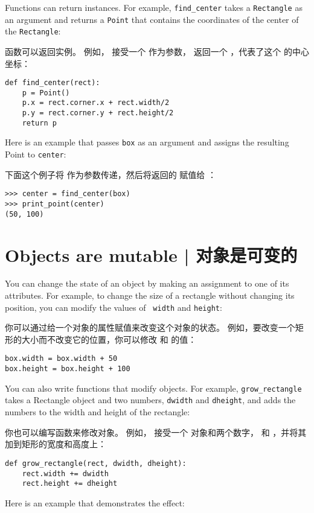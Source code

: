 Functions can return instances.  For example, \verb"find_center"
takes a {\tt Rectangle} as an argument and returns a {\tt Point}
that contains the coordinates of the center of the {\tt Rectangle}:

函数可以返回实例。 例如，  接受一个  作为参数，
返回一个  ，代表了这个  的中心坐标：

\begin{lstlisting}
def find_center(rect):
    p = Point()
    p.x = rect.corner.x + rect.width/2
    p.y = rect.corner.y + rect.height/2
    return p
\end{lstlisting}

%
Here is an example that passes {\tt box} as an argument and assigns
the resulting Point to {\tt center}:

下面这个例子将  作为参数传递，然后将返回的  赋值给 ：

\begin{lstlisting}
>>> center = find_center(box)
>>> print_point(center)
(50, 100)
\end{lstlisting}
%

\section{Objects are mutable  |  对象是可变的}
  

You can change the state of an object by making an assignment to one of
its attributes.  For example, to change the size of a rectangle
without changing its position, you can modify the values of {\tt
width} and {\tt height}:


你可以通过给一个对象的属性赋值来改变这个对象的状态。
例如，要改变一个矩形的大小而不改变它的位置，你可以修改  和  的值：

\begin{lstlisting}
box.width = box.width + 50
box.height = box.height + 100
\end{lstlisting}
%
You can also write functions that modify objects.  For example,
\verb"grow_rectangle" takes a Rectangle object and two numbers,
{\tt dwidth} and {\tt dheight}, and adds the numbers to the
width and height of the rectangle:

你也可以编写函数来修改对象。
例如， 接受一个 对象和两个数字，
 和 ，并将其加到矩形的宽度和高度上：

\begin{lstlisting}
def grow_rectangle(rect, dwidth, dheight):
    rect.width += dwidth
    rect.height += dheight
\end{lstlisting}
%
Here is an example that demonstrates the effect:

